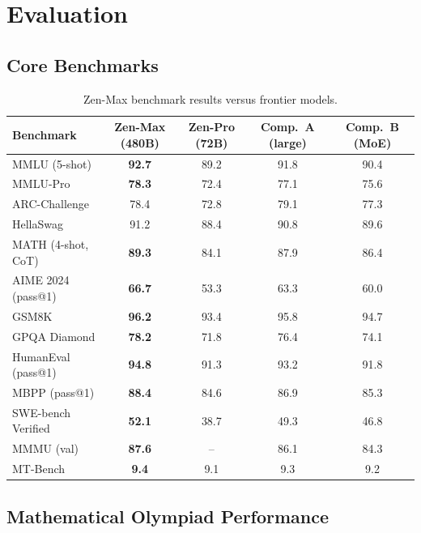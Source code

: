 \documentclass[11pt,a4paper]{article}
\begin{document}
\section{Evaluation}

\subsection{Core Benchmarks}

\begin{table}[H]
\centering
\caption{Zen-Max benchmark results versus frontier models.}
\label{tab:benchmarks}
\begin{tabular}{lcccc}
\toprule
\textbf{Benchmark} & \textbf{Zen-Max (480B)} & \textbf{Zen-Pro (72B)} & \textbf{Comp.\ A (large)} & \textbf{Comp.\ B (MoE)} \\
\midrule
MMLU (5-shot)          & \textbf{92.7} & 89.2 & 91.8 & 90.4 \\
MMLU-Pro               & \textbf{78.3} & 72.4 & 77.1 & 75.6 \\
ARC-Challenge          & 78.4 & 72.8 & 79.1 & 77.3 \\
HellaSwag              & 91.2 & 88.4 & 90.8 & 89.6 \\
\midrule
MATH (4-shot, CoT)     & \textbf{89.3} & 84.1 & 87.9 & 86.4 \\
AIME 2024 (pass@1)     & \textbf{66.7} & 53.3 & 63.3 & 60.0 \\
GSM8K                  & \textbf{96.2} & 93.4 & 95.8 & 94.7 \\
GPQA Diamond           & \textbf{78.2} & 71.8 & 76.4 & 74.1 \\
\midrule
HumanEval (pass@1)     & \textbf{94.8} & 91.3 & 93.2 & 91.8 \\
MBPP (pass@1)          & \textbf{88.4} & 84.6 & 86.9 & 85.3 \\
SWE-bench Verified     & \textbf{52.1} & 38.7 & 49.3 & 46.8 \\
\midrule
MMMU (val)             & \textbf{87.6} & --   & 86.1 & 84.3 \\
MT-Bench               & \textbf{9.4}  &  9.1 &  9.3 &  9.2 \\
\bottomrule
\end{tabular}
\end{table}

\subsection{Mathematical Olympiad Performance}
\end{document}
